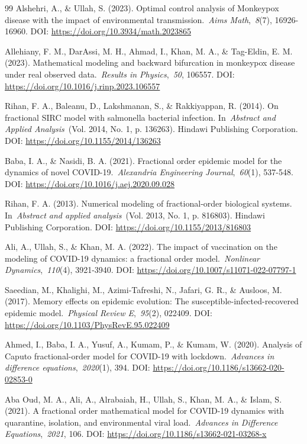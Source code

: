 \documentclass[10pt]{NSP1}
\begin{document}
\begin{thebibliography}{99}
Alshehri, A., \& Ullah, S. (2023). Optimal control analysis of Monkeypox disease with the impact of environmental transmission.~\emph{Aims Math},~\emph{8}(7), 16926-16960. DOI: \url{https://doi.org/10.3934/math.2023865}

Allehiany, F. M., DarAssi, M. H., Ahmad, I., Khan, M. A., \& Tag-Eldin, E. M. (2023). Mathematical modeling and backward bifurcation in monkeypox disease under real observed data.~\emph{Results in Physics},~\emph{50}, 106557. DOI: \url{https://doi.org/10.1016/j.rinp.2023.106557}

Rihan, F. A., Baleanu, D., Lakshmanan, S., \& Rakkiyappan, R. (2014). On fractional SIRC model with salmonella bacterial infection. In~\emph{Abstract and Applied Analysis}~(Vol. 2014, No. 1, p. 136263). Hindawi Publishing Corporation. DOI: \url{https://doi.org/10.1155/2014/136263}

Baba, I. A., \& Nasidi, B. A. (2021). Fractional order epidemic model for the dynamics of novel COVID-19.~\emph{Alexandria Engineering Journal},~\emph{60}(1), 537-548. DOI: \url{https://doi.org/10.1016/j.aej.2020.09.028}

Rihan, F. A. (2013). Numerical modeling of fractional‐order biological systems. In~\emph{Abstract and applied analysis}~(Vol. 2013, No. 1, p. 816803). Hindawi Publishing Corporation. DOI: \url{https://doi.org/10.1155/2013/816803}

Ali, A., Ullah, S., \& Khan, M. A. (2022). The impact of vaccination on the modeling of COVID-19 dynamics: a fractional order model.~\emph{Nonlinear Dynamics},~\emph{110}(4), 3921-3940. DOI: \url{https://doi.org/10.1007/s11071-022-07797-1}

Saeedian, M., Khalighi, M., Azimi-Tafreshi, N., Jafari, G. R., \& Ausloos, M. (2017). Memory effects on epidemic evolution: The susceptible-infected-recovered epidemic model.~\emph{Physical Review E},~\emph{95}(2), 022409. DOI: \url{https://doi.org/10.1103/PhysRevE.95.022409}

Ahmed, I., Baba, I. A., Yusuf, A., Kumam, P., \& Kumam, W. (2020). Analysis of Caputo fractional-order model for COVID-19 with lockdown.~\emph{Advances in difference equations},~\emph{2020}(1), 394. DOI: \url{https://doi.org/10.1186/s13662-020-02853-0}

Aba Oud, M. A., Ali, A., Alrabaiah, H., Ullah, S., Khan, M. A., \& Islam, S. (2021). A fractional order mathematical model for COVID-19 dynamics with quarantine, isolation, and environmental viral load.~\emph{Advances in Difference Equations},~\emph{2021}, 106. DOI: \url{https://doi.org/10.1186/s13662-021-03268-x}


\end{thebibliography}
\end{document}
